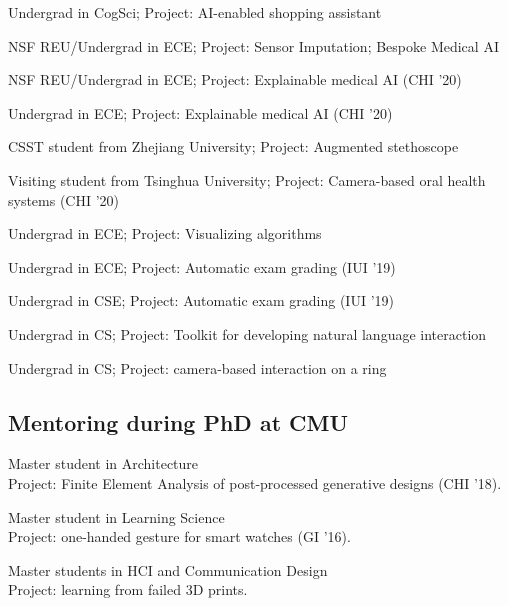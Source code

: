  {
	 {
		Undergrad in CogSci; Project: AI-enabled shopping assistant
	}
}

 {
	 {
		NSF REU/Undergrad in ECE; Project: Sensor Imputation; Bespoke Medical AI
	}
}

 {
	 {
		NSF REU/Undergrad in ECE; Project: Explainable medical AI (CHI '20)
	}
}

 {
	 {
		Undergrad in ECE; Project: Explainable medical AI (CHI '20)
	}
}

 {
	 {
		CSST student from Zhejiang University; Project: Augmented stethoscope
	}
}

 {
	 {
		Visiting student from Tsinghua University; Project: Camera-based oral health systems (CHI '20)
	}
}

 {
	 {
		Undergrad in ECE; Project: Visualizing algorithms
	}
}

 {
	 {
		Undergrad in ECE;
		Project: Automatic exam grading (IUI '19)
	}
}

 {
	 {
		Undergrad in CSE;
		Project: Automatic exam grading (IUI '19)
	}
}

 {
	 {
		Undergrad in CS;
		Project: Toolkit for developing natural language interaction
	}
}


 {
	 {
		Undergrad in CS;
		Project: camera-based interaction on a ring
	}
}

\subsection{Mentoring during PhD at CMU}
 {
	 {
		Master student in Architecture\\
		Project: Finite Element Analysis of post-processed generative designs (CHI '18).
	}
}

 {
	 {
		Master student in Learning Science\\
		Project: one-handed gesture for smart watches (GI '16).
	}
}

 {
	 {
		Master students in HCI and Communication Design\\
		Project: learning from failed 3D prints.
	}
}